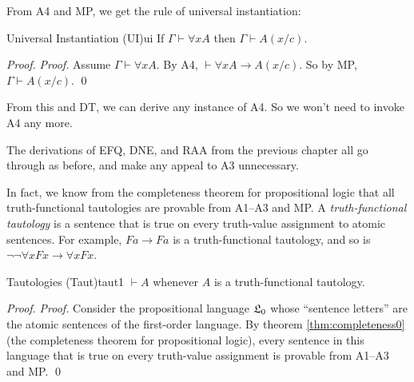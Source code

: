 \endgroup

From A4 and MP, we get the rule of universal instantiation:

\begin{theorem}{Universal Instantiation (UI)}{ui}
  If $\Gamma \vdash \forall x A$ then $\Gamma \vdash A(x/c)$.
\end{theorem}
\begin{proof}
  \emph{Proof.}
  Assume $\Gamma \vdash \forall x A$.
  By A4,
  $\vdash \forall x A \to A(x/c)$.
  So by MP,
  $\Gamma \vdash A(x/c)$.
  \qed
\end{proof}

From this and DT,
we can derive any instance of A4.
So we won't need to invoke A4 any more.

The derivations of EFQ, DNE, and RAA from the previous chapter all go through as before,
and make any appeal to A3 unnecessary.

In fact,
we know from the completeness theorem for propositional logic that
all truth-functional tautologies are provable from A1--A3 and MP.
A \emph{truth-functional tautology} is a sentence that is true on every truth-value assignment to atomic sentences.
For example,
$Fa \to Fa$ is a truth-functional tautology,
and so is $\neg\neg \forall x Fx \to \forall x Fx$.

\begin{theorem}{Tautologies (Taut)}{taut1}
  $\vdash A$ whenever $A$ is a truth-functional tautology.
\end{theorem}
\begin{proof}
  \emph{Proof.}
  Consider the propositional language $\mathfrak{L}_0$ whose ``sentence letters'' are
  the atomic sentences of the first-order language.
  By theorem \ref{thm:completeness0}
  (the completeness theorem for propositional logic),
  every sentence in this language that is true on every truth-value assignment
  is provable from A1--A3 and MP.
  \qed
\end{proof}



